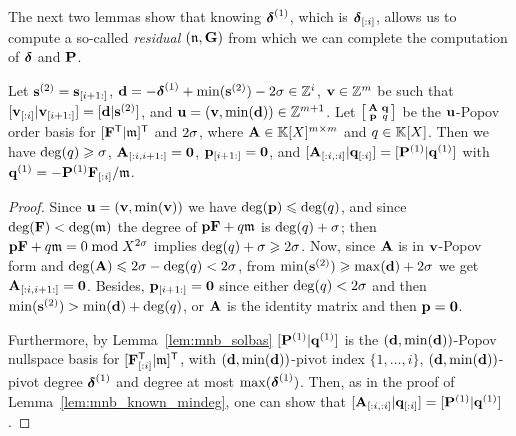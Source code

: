 \documentclass[preprint]{sig-alternate-05-2015}
\begin{document}
\vspace{-0.2cm}
The next two lemmas show that knowing $\minDegs^{(1)}$, which is
$\subVec{\minDegs}{}{i}$, allows us to compute a so-called \emph{residual}
$(\modulus[n],\mat{G})$ from which we can complete the computation of
$\minDegs$ and $\msb$.

\vspace{-0.15cm}
\begin{lem}
  \label{lem:one:order_basis_shape}
  Let $\shifts^{(2)} = \subVec{\shifts}{i+1}{}$, $\shifts[d] =
  -\minDegs^{(1)}+\min(\shifts^{(2)})-2\degMod \in \shiftSpace[i]$, $\shifts[v]
  \in \shiftSpace$ be such that $[\subVec{\shifts[v]}{}{i} |
  \subVec{\shifts[v]}{i+1}{}] = [\shifts[d] | \shifts^{(2)}]$, and $\shifts[u]
  = (\shifts[v],\min(\shifts[d])) \in \shiftSpace[\nbun+1]$.  Let 
  $\left[ \begin{smallmatrix}
    \mat{A} & \col{q} \\
    \row{p} & q 
  \end{smallmatrix} \right]$
  be the $\shifts[u]$-Popov order basis for $\trsp{[\trsp{\sys} | \modulus]}$
  and $2\degMod$, where $\mat{A} \in \polMatSpace[\nbun]$ and $q \in \polRing$.
  Then we have $\deg(q) \ge \degMod$, $\subMat{\mat{A}}{}{i}{i+1}{} = \mat{0}$,
  $\subVec{\row{p}}{i+1}{} = \mat{0}$, and $[ \subMat{\mat{A}}{}{i}{}{i} |
  \subVec{\row{q}}{}{i} ] = [ \msb^{(1)} | \col{q}^{(1)} ]$ with $\col{q}^{(1)}
  = -\msb^{(1)} \subVec{\sys}{}{i} / \modulus$.
\end{lem}
\begin{proof}
  \vspace{-0.1cm}
  Since $\shifts[u] = (\shifts[v],\min(\shifts[v]))$ we have $\deg(\row{p}) \le
  \deg(q)$, and since $\deg(\sys) < \deg(\modulus)$ the degree of $\row{p} \sys
  + q \modulus$ is $\deg(q) + \degMod$; then $\row{p} \sys + q \modulus = 0
  \bmod X^{2\degMod}$ implies $\deg(q) + \degMod \ge 2\degMod$. Now, since
  $\mat{A}$ is in $\shifts[v]$-Popov form and $\deg(\mat{A}) \le 2\degMod -
  \deg(q) < 2\degMod$, from $\min(\shifts^{(2)}) \ge \max(\shifts[d]) +
  2\degMod$ we get $\subMat{\mat{A}}{}{i}{i+1}{} = \mat{0}$. Besides,
  $\subVec{\row{p}}{i+1}{} = \mat{0}$ since either $\deg(q)<2\degMod$ and then
  $\min(\shifts^{(2)}) > \min(\shifts[d]) + \deg(q)$, or $\mat{A}$ is the
  identity matrix and then $\row{p} = \row{0}$.

  Furthermore, by Lemma~\ref{lem:mnb_solbas} $[\msb^{(1)} | \col{q}^{(1)}]$ is the
  $(\shifts[d],\min(\shifts[d]))$-Popov nullspace basis for
  $\trsp{[\trsp{\subVec{\sys}{}{i}} | \modulus]}$, with
  $(\shifts[d],\min(\shifts[d]))$-pivot index $\{1,\ldots,i\}$,
  $(\shifts[d],\min(\shifts[d]))$-pivot degree $\minDegs^{(1)}$ and degree at
  most $\max(\minDegs^{(1)})$. Then, as in the proof of
  Lemma~\ref{lem:mnb_known_mindeg}, one can show that $[
  \subMat{\mat{A}}{}{i}{}{i} | \subVec{\row{q}}{}{i} ] = [ \msb^{(1)} |
  \col{q}^{(1)} ]$.
\end{proof}
\end{document}
